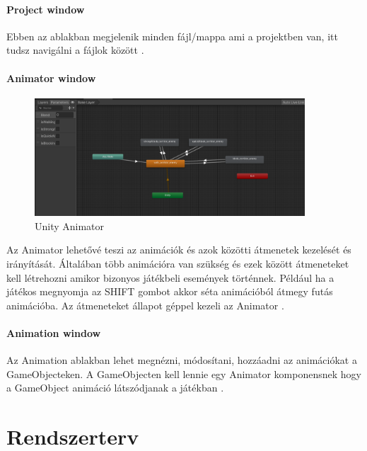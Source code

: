 \documentclass[
]{thesis-ekf}
\theoremstyle{definition}
\theoremstyle{remark}
\begin{document}
\subsubsection{Project window}
Ebben az ablakban megjelenik minden fájl/mappa ami a projektben van, itt tudsz navigálni a fájlok között \cite{UnityProject}.
\subsubsection{Animator window}

\begin{figure}[h!]
	\centering
	\includegraphics[width=0.9\textwidth]{UnityAnimatorKep.png}
	\caption{Unity Animator}
	\label{fig:unityAnimator}
\end{figure}
Az Animator lehetővé teszi az animációk és azok közötti átmenetek kezelését és irányítását. Általában több animációra van szükség és ezek között átmeneteket kell létrehozni amikor bizonyos játékbeli események történnek. Például ha a játékos megnyomja az SHIFT gombot akkor séta animációból átmegy futás animációba. Az átmeneteket állapot géppel kezeli az Animator \cite{UnityAnimatorController}.

\subsubsection{Animation window}
Az Animation ablakban lehet megnézni, módosítani, hozzáadni az animációkat a GameObjecteken. A GameObjecten kell lennie egy Animator komponensnek hogy a GameObject animáció látszódjanak a játékban \cite{UnityAnimation}.

\chapter{Rendszerterv}
\end{document}
